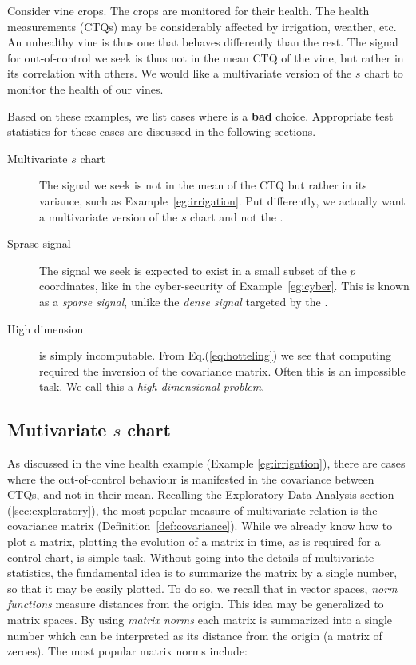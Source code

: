 \begin{example}
\label{eg:irrigation}
Consider vine crops.
The crops are monitored for their health.
The health measurements (CTQs) may be considerably affected by irrigation, weather, etc.
An unhealthy vine is thus one that behaves differently than the rest. 
The signal for out-of-control we seek is thus not in the mean CTQ of the vine, but rather in its correlation with others. 
We would like a multivariate version of the $s$ chart to monitor the health of our vines.  
\end{example}


Based on these examples, we list cases where \tsq is a \textbf{bad} choice. Appropriate test statistics for these cases are discussed in the following sections.
\begin{description}

\item [Multivariate $s$ chart] The signal we seek is not in the mean of the CTQ but rather in its variance, such as Example~\ref{eg:irrigation}. Put differently, we actually want a multivariate version of the $s$ chart and not the \barxChart. 

\item [Sprase signal] The signal we seek is expected to exist in a small subset of the $p$ coordinates, like in the cyber-security of Example~\ref{eg:cyber}. This is known as a \emph{sparse signal}, unlike the \emph{dense signal} targeted by the \tsq. 

\item [High dimension] \tsq is simply incomputable. From Eq.(\ref{eq:hotteling}) we see that computing \tsq required the inversion of the covariance matrix. Often this is an impossible task. We call this a \emph{high-dimensional problem}.
\end{description}




\subsection{Mutivariate $s$ chart}
\label{sec:multivarite_s}

As discussed in the vine health example (Example \ref{eg:irrigation}), there are cases where the out-of-control behaviour is manifested in the covariance between CTQs, and not in their mean.
Recalling the Exploratory Data Analysis section (\ref{sec:exploratory}), the most popular measure of multivariate relation is the covariance matrix (Definition~\ref{def:covariance}).
While we already know how to plot a matrix, plotting the evolution of a matrix in time, as is required for a control chart, is simple task. 
Without going into the details of multivariate statistics, the fundamental idea is to summarize the matrix by a single number, so that it may be easily plotted. 
To do so, we recall that in vector spaces, \emph{norm functions} measure distances from the origin.
This idea may be generalized to matrix spaces. By using \emph{matrix norms} each matrix is summarized into a single number which can be interpreted as its distance from the origin (a matrix of zeroes).
The most popular matrix norms include:

